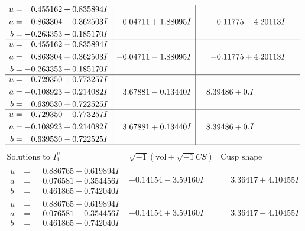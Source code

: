 \documentclass[1p]{elsarticle_modified}
\theoremstyle{definition}
\newcommand{\I}{\sqrt{-1}}
\begin{document}
$$\begin{array}{c|c|c}
\begin{aligned}
u &= \phantom{-}0.455162 + 0.835894 I \\
a &= \phantom{-}0.863304 - 0.362503 I \\
b &= -0.263353 - 0.185170 I\end{aligned}
 & -0.04711 + 1.88095 I & -0.11775 - 4.20113 I \\ \hline\begin{aligned}
u &= \phantom{-}0.455162 - 0.835894 I \\
a &= \phantom{-}0.863304 + 0.362503 I \\
b &= -0.263353 + 0.185170 I\end{aligned}
 & -0.04711 - 1.88095 I & -0.11775 + 4.20113 I \\ \hline\begin{aligned}
u &= -0.729350 + 0.773257 I \\
a &= -0.108923 - 0.214082 I \\
b &= \phantom{-}0.639530 + 0.722525 I\end{aligned}
 & \phantom{-}3.67881 - 0.13440 I & \phantom{-}8.39486 + 0. I\phantom{ +0.000000I} \\ \hline\begin{aligned}
u &= -0.729350 - 0.773257 I \\
a &= -0.108923 + 0.214082 I \\
b &= \phantom{-}0.639530 - 0.722525 I\end{aligned}
 & \phantom{-}3.67881 + 0.13440 I & \phantom{-}8.39486 + 0. I\phantom{ +0.000000I}\\
 \hline 
 \end{array}$$\newpage$$\begin{array}{c|c|c}  
\text{Solutions to }I^u_{1}& \I (\text{vol} + \sqrt{-1}CS) & \text{Cusp shape}\\
 \hline 
\begin{aligned}
u &= \phantom{-}0.886765 + 0.619894 I \\
a &= \phantom{-}0.076581 + 0.354456 I \\
b &= \phantom{-}0.461865 - 0.742040 I\end{aligned}
 & -0.14154 - 3.59160 I & \phantom{-}3.36417 + 4.10455 I \\ \hline\begin{aligned}
u &= \phantom{-}0.886765 - 0.619894 I \\
a &= \phantom{-}0.076581 - 0.354456 I \\
b &= \phantom{-}0.461865 + 0.742040 I\end{aligned}
 & -0.14154 + 3.59160 I & \phantom{-}3.36417 - 4.10455 I \\ \hline\begin{aligned}

\end{aligned}
\end{array}$$
\end{document}
